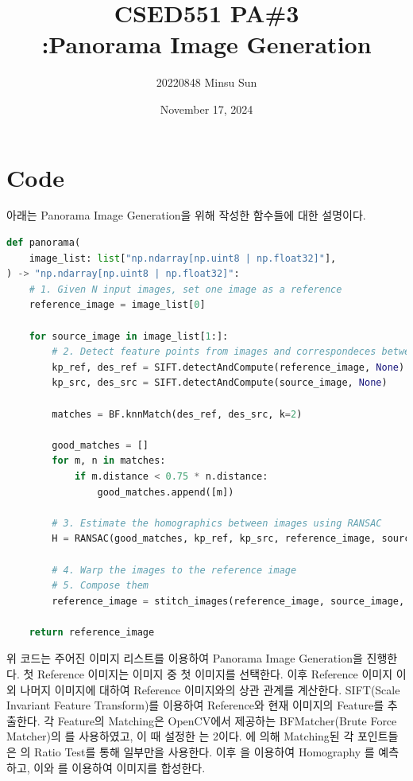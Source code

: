 \documentclass{report}
\title{CSED551 PA\#3 \\[0.5ex] {\normalsize :Panorama Image Generation}}
\author{\small{20220848 Minsu Sun}}
\date{\small{November 17, 2024}}
\begin{document}
\maketitle

\section*{Code}

아래는 Panorama Image Generation을 위해 작성한 함수들에 대한 설명이다.

\begin{lstlisting}[language=Python, caption=panorama, firstnumber=117]
def panorama(
    image_list: list["np.ndarray[np.uint8 | np.float32]"],
) -> "np.ndarray[np.uint8 | np.float32]":
    # 1. Given N input images, set one image as a reference
    reference_image = image_list[0]

    for source_image in image_list[1:]:
        # 2. Detect feature points from images and correspondeces between pairs of images
        kp_ref, des_ref = SIFT.detectAndCompute(reference_image, None)
        kp_src, des_src = SIFT.detectAndCompute(source_image, None)

        matches = BF.knnMatch(des_ref, des_src, k=2)

        good_matches = []
        for m, n in matches:
            if m.distance < 0.75 * n.distance:
                good_matches.append([m])

        # 3. Estimate the homographics between images using RANSAC
        H = RANSAC(good_matches, kp_ref, kp_src, reference_image, source_image)

        # 4. Warp the images to the reference image
        # 5. Compose them
        reference_image = stitch_images(reference_image, source_image, H)

    return reference_image
\end{lstlisting}

위 코드는 주어진 이미지 리스트를 이용하여 Panorama Image Generation을 진행한다.
첫 Reference 이미지는 이미지 중 첫 이미지를 선택한다.
이후 Reference 이미지 이외 나머지 이미지에 대하여 Reference 이미지와의 상관 관계를 계산한다.
SIFT(Scale Invariant Feature Transform)를 이용하여 Reference와 현재 이미지의 Feature를 추출한다.
각 Feature의 Matching은 OpenCV에서 제공하는 BFMatcher(Brute Force Matcher)의 를 사용하였고, 이 때 설정한 는 2이다.
에 의해 Matching된 각 포인트들은 의 Ratio Test를 통해 일부만을 사용한다.
이후 을 이용하여 Homography 를 예측하고, 이와 를 이용하여 이미지를 합성한다.
\end{document}

